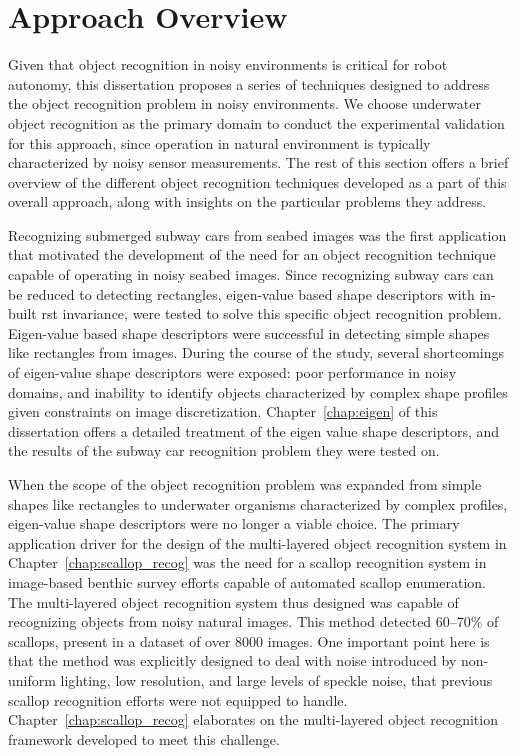 \documentclass {udthesis}
\begin{document}
\section{Approach Overview}

Given that object recognition in noisy environments is critical for robot autonomy, this dissertation proposes a series of techniques designed to address the object recognition problem in noisy environments.
We choose
underwater object recognition as the primary domain to conduct the experimental validation for this approach, since operation in natural environment is typically characterized by noisy sensor measurements.
The rest of this section offers a brief overview of the different object recognition techniques developed as a part of this overall approach, along with insights on the particular problems they address.

Recognizing submerged subway cars from seabed images was the first application that motivated the development of the need for 
an object recognition technique capable of operating in noisy seabed images. Since recognizing subway cars can be reduced 
to detecting rectangles, eigen-value based shape descriptors with in-built \gls{rst} invariance, were tested
to solve this specific object recognition problem. Eigen-value based shape descriptors were successful in detecting 
simple shapes like rectangles from images.
During the course of the study, several shortcomings of eigen-value shape descriptors were exposed: poor performance in noisy domains, and inability to identify objects characterized by complex shape profiles given constraints on image discretization. Chapter~\ref{chap:eigen} of this dissertation offers a detailed treatment of the eigen value shape descriptors, and the results of the subway car recognition problem they were tested on.

When the scope of the object recognition problem was expanded from simple shapes like rectangles to underwater organisms characterized by complex profiles,
eigen-value shape descriptors were no longer a viable choice. The primary application driver for the design of the multi-layered object recognition system in Chapter~\ref{chap:scallop_recog} was the need for a 
scallop recognition system in image-based benthic survey efforts capable of automated scallop enumeration. 
The multi-layered object recognition system thus designed was capable of recognizing objects from noisy natural images. This method detected 60--70\% of scallops, present in a dataset of over 8000 images. One important point here is that the method was explicitly designed to deal with noise introduced by non-uniform lighting, low resolution, and large levels of speckle noise, that previous scallop recognition efforts were not equipped to handle. Chapter~\ref{chap:scallop_recog} elaborates on the multi-layered object recognition framework developed to meet this challenge.
\end{document}
